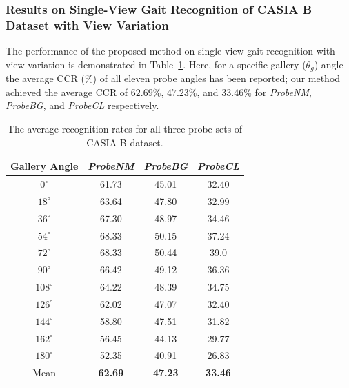 \subsubsection{Results on Single-View Gait Recognition of CASIA B Dataset with View Variation}
The performance of the proposed method on single-view gait recognition with view variation is demonstrated in Table~\ref{table:result_casia_b_with_view}. Here, for a specific gallery ($ \theta_g $) angle the average CCR (\%) of all eleven probe angles has been reported; our method achieved the average CCR of $62.69\%$, $47.23\%$, and $33.46\%$ for \textit{ProbeNM}, \textit{ProbeBG}, and \textit{ProbeCL} respectively.


\begin{table}[t]
	\centering
	\caption{The average recognition rates for all three probe sets of CASIA B dataset. \label{table:result_casia_b_with_view}}
	{\begin{tabular*}{22pc}{cccc}\hline
			Gallery Angle &\textit{ProbeNM} &\textit{ProbeBG} &\textit{ProbeCL} \\\hline\noalign{\smallskip}
			${0^{\circ}}$	&61.73  &45.01  &32.40 \\\noalign{\smallskip}
			${18^{\circ}}$  &63.64  &47.80  &32.99 \\\noalign{\smallskip}
			${36^{\circ}}$	&67.30  &48.97  &34.46 \\\noalign{\smallskip}
			${54^{\circ}}$	&68.33  &50.15  &37.24 \\\noalign{\smallskip}
			${72^{\circ}}$	&68.33  &50.44  &39.0  \\\noalign{\smallskip}
			${90^{\circ}}$	&66.42  &49.12  &36.36  \\\noalign{\smallskip}
			${108^{\circ}}$ &64.22  &48.39  &34.75  \\\noalign{\smallskip}
			${126^{\circ}}$ &62.02  &47.07  &32.40  \\\noalign{\smallskip}
			${144^{\circ}}$ &58.80  &47.51  &31.82  \\\noalign{\smallskip}
			${162^{\circ}}$	&56.45  &44.13  &29.77  \\\noalign{\smallskip}
			${180^{\circ}}$ &52.35  &40.91  &26.83  \\\noalign{\smallskip}
			Mean &\textbf{62.69}  &\textbf{47.23} &\textbf{33.46} \\\hline
			
	\end{tabular*}}{}
\end{table}




